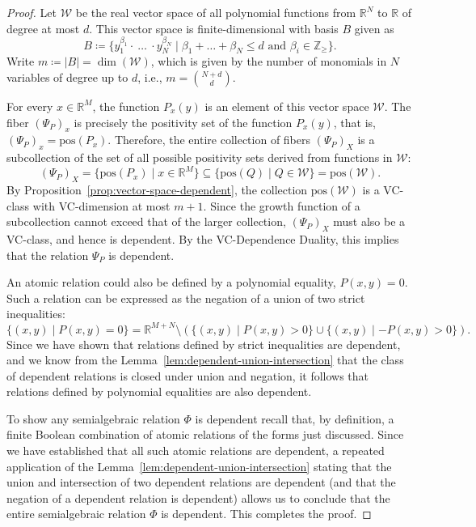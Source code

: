 \begin{proof}
    Let $\mathcal{W}$ be the real vector space of all polynomial functions from $\mathbb{R}^N$ to $\mathbb{R}$ of degree at most $d$. This vector space is finite-dimensional with basis $B$ given as
    \[
        B \coloneq \{ y_1^{\beta_1} \cdot \ \dots \ \cdot y_N^{\beta_N} \mid   \beta_1 + \dots + \beta_N \leq d \text{ and } \beta_i \in \mathbb{Z}_{\geq} \}.
    \]
    Write $m \coloneq |B| = \dim(\mathcal{W})$, which is given by the number of monomials in $N$ variables of degree up to $d$, i.e., $m = \binom{N+d}{d}$.

    For every $x \in \mathbb{R}^M$, the function $P_x(y)$ is an element of this vector space $\mathcal{W}$. The fiber $(\Psi_P)_x$ is precisely the positivity set of the function $P_x(y)$, that is, $(\Psi_P)_x = \text{pos}(P_x)$. Therefore, the entire collection of fibers $(\Psi_P)_X$ is a subcollection of the set of all possible positivity sets derived from functions in $\mathcal{W}$:
    \[
        (\Psi_P)_X = \{\text{pos}(P_x) \mid x \in \mathbb{R}^M\} \subseteq \{\text{pos}(Q) \mid Q \in \mathcal{W}\} = \text{pos}(\mathcal{W}).
    \]
    By Proposition~\ref{prop:vector-space-dependent}, the collection $\text{pos}(\mathcal{W})$ is a VC-class with VC-dimension at most $m+1$. Since the growth function of a subcollection cannot exceed that of the larger collection, $(\Psi_P)_X$ must also be a VC-class, and hence is dependent. By the VC-Dependence Duality, this implies that the relation $\Psi_P$ is dependent.

    An atomic relation could also be defined by a polynomial equality, $P(x, y) = 0$. Such a relation can be expressed as the negation of a union of two strict inequalities:
    \[
        \{(x,y) \mid P(x,y) = 0\} = \mathbb{R}^{M+N} \setminus \left( \{(x,y) \mid P(x,y) > 0\} \cup \{(x,y) \mid -P(x,y) > 0\} \right).
    \]
    Since we have shown that relations defined by strict inequalities are dependent, and we know from the Lemma~\ref{lem:dependent-union-intersection} that the class of dependent relations is closed under union and negation, it follows that relations defined by polynomial equalities are also dependent.

    To show any semialgebraic relation $\Phi$ is dependent recall that, by definition, a finite Boolean combination of atomic relations of the forms just discussed. Since we have established that all such atomic relations are dependent, a repeated application of the Lemma~\ref{lem:dependent-union-intersection} stating that the union and intersection of two dependent relations are dependent (and that the negation of a dependent relation is dependent) allows us to conclude that the entire semialgebraic relation $\Phi$ is dependent. This completes the proof.
\end{proof}
